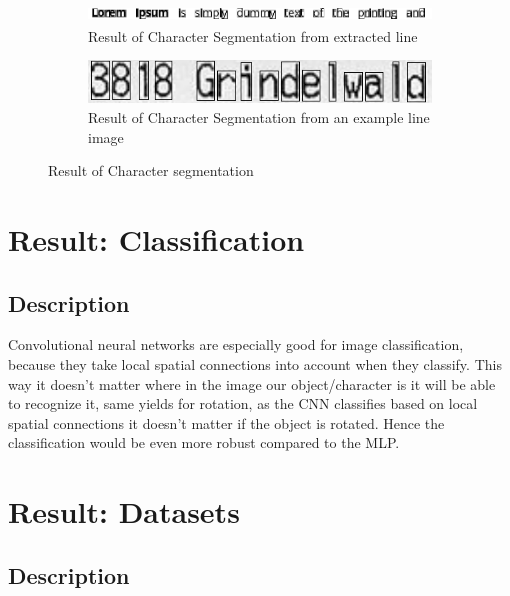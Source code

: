 \documentclass[Report.tex]{subfiles}
\begin{document}
\begin{figure}[H]
  \begin{subfigure}[t]{\textwidth}
    \centering
    \includegraphics[height=0.45cm]{res/segment_letter1.png}
    \caption{Result of Character Segmentation from extracted line}
  \end{subfigure}
  \begin{subfigure}[t]{\textwidth}
    \centering
    \includegraphics[width=12cm]{res/segment_letter2.png}
    \caption{Result of Character Segmentation from an example line image}
  \end{subfigure}
  \caption{Result of Character segmentation}
  \label{fig:Character_segmentation}
\end{figure}

\section{Result: Classification}

\subsection{Description}
\begin{flushleft}
  Convolutional neural networks are especially good for image
  classification, because they take local spatial connections into account when
  they classify. This way it doesn't matter where in the image our
  object/character is it will be able to recognize it, same yields for rotation,
  as the CNN classifies based on local spatial connections it doesn't matter if
  the object is rotated. Hence the classification would be even more robust
  compared to the MLP.
\end{flushleft}

\section{Result: Datasets}
\subsection{Description}
\end{document}
